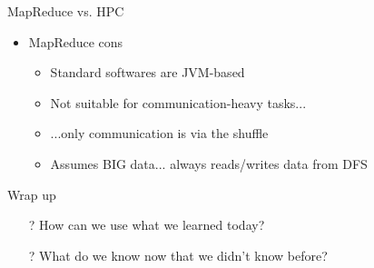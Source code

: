 \documentclass[aspectratio=169]{beamer}
\begin{document}
\begin{frame}{MapReduce vs. HPC}

\begin{itemize}
\item MapReduce cons
        \begin{itemize}
        \item Standard softwares are JVM-based
        \item Not suitable for communication-heavy tasks...
	\item ...only communication is via the shuffle
        \item Assumes BIG data... always reads/writes data from DFS
        \end{itemize}
\end{itemize}
\end{frame}

\begin{frame}{Wrap up}
\begin{itemize}
	\item[?] How can we use what we learned today?
	\vspace{2em}
	\item[?] What do we know now that we didn't know before?
\end{itemize}


\end{frame}
\end{document}
